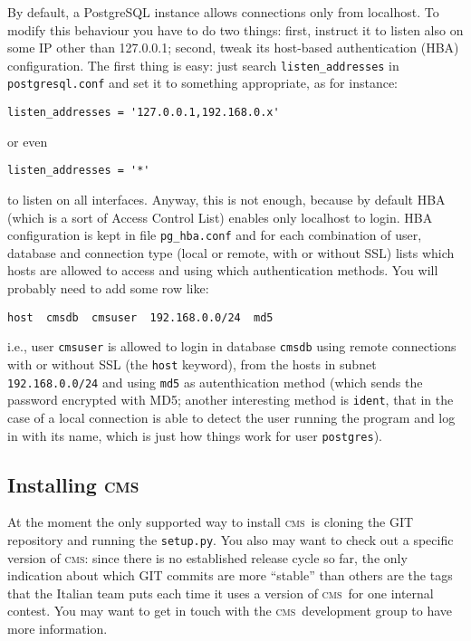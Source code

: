 \documentclass[a4paper,8pt]{amsart}
\newcommand{\CMS}{\textsc{cms}}
\newcommand{\id}[1]{\texttt{#1}}
\newcommand{\file}[1]{\texttt{#1}}
\begin{document}
\begin{multicols}{2}
  By default, a PostgreSQL instance allows connections only from
  localhost. To modify this behaviour you have to do two things:
  first, instruct it to listen also on some IP other than 127.0.0.1;
  second, tweak its host-based authentication (HBA) configuration. The
  first thing is easy: just search \id{listen\_addresses} in
  \file{postgresql.conf} and set it to something appropriate, as for
  instance:
\begin{verbatim}
listen_addresses = '127.0.0.1,192.168.0.x'
\end{verbatim}
  or even
\begin{verbatim}
listen_addresses = '*'
\end{verbatim}
  to listen on all interfaces. Anyway, this is not enough, because by
  default HBA (which is a sort of Access Control List) enables only
  localhost to login. HBA configuration is kept in file
  \file{pg\_hba.conf} and for each combination of user, database and
  connection type (local or remote, with or without SSL) lists which
  hosts are allowed to access and using which authentication methods. You will probably need to add some row like:
\begin{verbatim}
host  cmsdb  cmsuser  192.168.0.0/24  md5
\end{verbatim}
  i.e., user \id{cmsuser} is allowed to login in database \id{cmsdb}
  using remote connections with or without SSL (the \id{host}
  keyword), from the hosts in subnet \id{192.168.0.0/24} and using
  \id{md5} as autenthication method (which sends the password
  encrypted with MD5; another interesting method is \id{ident}, that
  in the case of a local connection is able to detect the user running
  the program and log in with its name, which is just how things work
  for user \id{postgres}).

  \subsection{Installing \CMS}

  At the moment the only supported way to install \CMS\ is cloning the
  GIT repository and running the \file{setup.py}. You also may want to
  check out a specific version of \CMS: since there is no established
  release cycle so far, the only indication about which GIT commits
  are more ``stable'' than others are the tags that the Italian team
  puts each time it uses a version of \CMS\ for one internal
  contest. You may want to get in touch with the \CMS\ development
  group to have more information.


\end{multicols}
\end{document}
